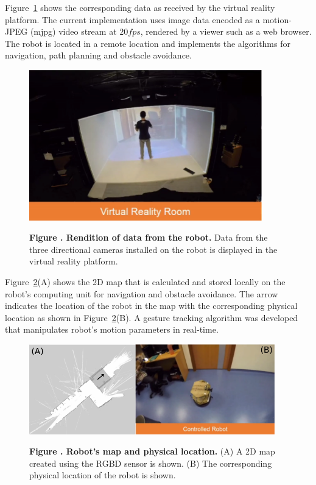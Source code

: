 Figure~\ref{fig:VR_setup} shows the corresponding data as received by the virtual reality platform. The current implementation uses image data encoded as a motion-JPEG (mjpg) video stream at $20fps$, rendered by a viewer such as a web browser. The robot is located in a remote location and implements the algorithms for navigation, path planning and obstacle avoidance.
\begin{figure}[h!]
	\begin{center}
		\includegraphics[width=0.90\textwidth]{figures/motion-seg/VR-Robot}%
	\end{center}
	\textbf{\label{fig:VR_setup} Figure . Rendition of data from the robot.} { Data from the three directional cameras installed on the robot is displayed in the virtual reality platform. }
\end{figure}

Figure~\ref{fig:robot-env}(A) shows the 2D map that is calculated and stored locally on the robot's computing unit for navigation and obstacle avoidance. The arrow indicates the location of the robot in the map with the corresponding physical location as shown in Figure~\ref{fig:robot-env}(B). A gesture tracking algorithm was developed that manipulates robot's motion parameters in real-time.
\begin{figure}[h!]
	\begin{center}
		\includegraphics[width=0.95\textwidth]{figures/motion-seg/robot-env}%
	\end{center}
	\textbf{\label{fig:robot-env} Figure . Robot's map and physical location.} { (A) A 2D map created using the RGBD sensor is shown. (B) The corresponding physical location of the robot is shown. }
\end{figure}

